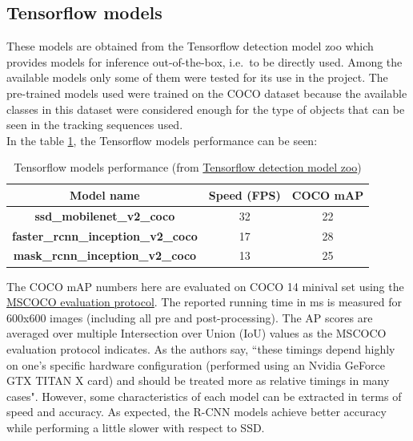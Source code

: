 \subsection{Tensorflow models} \label{tf_models}
These models are obtained from the Tensorflow detection model zoo which provides models for inference out-of-the-box, i.e.\ to be directly used. Among the available models only some of them were tested for its use in the project. The pre-trained models used were trained on the COCO dataset because the available classes in this dataset were considered enough for the type of objects that can be seen in the tracking sequences used.\\ In the table \ref{tab:tf_models}, the Tensorflow models performance can be seen:
\begin{table}[H]
\begin{center}
\begin{tabular}{|c|c|c|}
\hline
Model name                                 & Speed (FPS) & COCO mAP \\ \hline
\textbf{ssd\_mobilenet\_v2\_coco}          & 32         & 22       \\ \hline
\textbf{faster\_rcnn\_inception\_v2\_coco} & 17         & 28       \\ \hline
\textbf{mask\_rcnn\_inception\_v2\_coco}   & 13         & 25       \\ \hline
\end{tabular}
\end{center}
\caption{Tensorflow models performance (from \href{https://github.com/tensorflow/models/blob/master/research/object_detection/g3doc/detection_model_zoo.md#coco-trained-models}{Tensorflow detection model zoo})}
\label{tab:tf_models}
\end{table}
The COCO mAP numbers here are evaluated on COCO 14 minival set using the \href{http://cocodataset.org/#detection-eval}{MSCOCO evaluation protocol}. The reported running time in ms is measured for 600x600 images (including all pre and post-processing). The AP scores are averaged over multiple Intersection over Union (IoU) values as the MSCOCO evaluation protocol indicates. As the authors say, ``these timings depend highly on one's specific hardware configuration (performed using an Nvidia GeForce GTX TITAN X card) and should be treated more as relative timings in many cases". However, some characteristics of each model can be extracted in terms of speed and accuracy. As expected, the R-CNN models achieve better accuracy while performing a little slower with respect to SSD.

